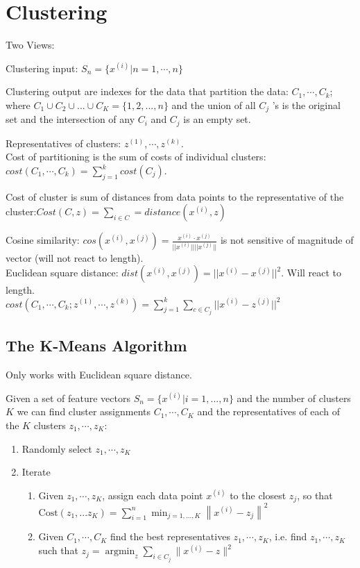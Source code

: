 \section{Clustering}

Two Views:

Clustering input: $S_n = \{x^{(i)}|n=1,\cdots,n\}$

Clustering output are indexes for the data that partition the data: $C_1,\cdots,C_k$; where $C_1 \cup C_2 \cup ... \cup C_ K = \big \{  1, 2, ..., n \big \}$ and the union of all  $C_j$ 's is the original set and the intersection of any  $C_i$  and  $C_j$  is an empty set.

Representatives of clusters: $z^{(1)},\cdots,z^{(k)}$.\\

Cost of partitioning is the sum of costs of individual clusters: $cost(C_1,\cdots,C_k) = \sum_{j=1}^k cost (C_j)$. 

Cost of cluster is sum of distances from data points to the representative of the cluster:$Cost(C,z) = \sum_{i \in C} = distance(x^{(i)},z)$

Cosine similarity: $cos(x^{(i)},x^{(j)}) = \frac{x^{(i)} \cdot x^{(j)}}{||x^{(i)}|| ||x^{(j)}||}$ is not sensitive of magnitude of vector (will not react to length).\\

Euclidean square distance: $dist(x^{(i)},x^{(j)})= ||x^{(i)}-x^{(j)}||^2$. Will react to length.\\

$cost(C_1,\cdots,C_k; z^{(1)},\cdots,z^{(k)}) = \sum_{j=1}^k \sum_{c \in C_j} ||x^{(i)}-z^{(j)}||^2 $

\subsection{The K-Means Algorithm}

Only works with Euclidean square distance.

Given a set of feature vectors $S_ n = \big \{ x^{(i)}| i = 1,...,n\big \}$ and the number of clusters  $K$ we can find cluster assignments  $C_1,\cdots,C_K$ and the representatives of each of the $K$ clusters $z_1,\cdots,z_K$:\\


\begin{enumerate}
\item Randomly select $z_1,\cdots,z_K$
\item Iterate
\begin{enumerate}
\item Given $z_1,\cdots,z_K$, assign each data point $x^{(i)}$ to the closest $z_j$, so that $\text {Cost}(z_1, ... z_ K) = \sum _{i=1}^{n} \min _{j=1,...,K} \left\|  x^{(i)} - z_ j \right\| ^2$
\item Given $C_1,\cdots,C_K$ find the best representatives $z_1,\cdots,z_K$, i.e. find $z_1,\cdots,z_K$ such that $\displaystyle z_ j=\operatorname {argmin}_{z} \sum _{i \in C_ j} \| x^{(i)} - z \| ^2$
\end{enumerate}
\end{enumerate}

